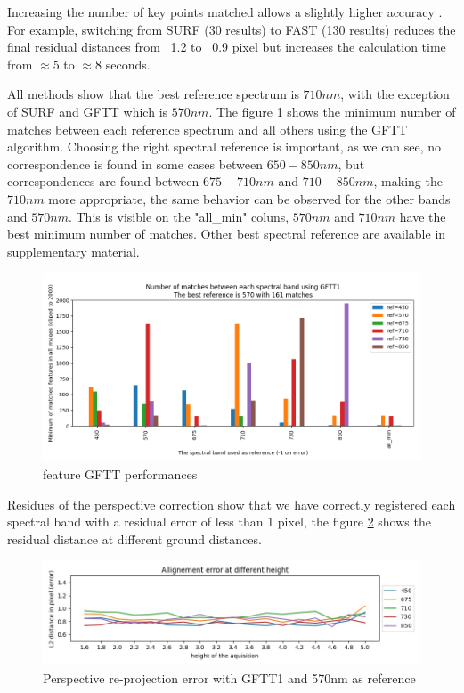 \documentclass[]{elsarticle}
\begin{document}
	\par Increasing the number of key points matched allows a slightly higher accuracy \cite{DantasDiasJunior, }.
	For example, switching from SURF (30 results) to FAST (130 results) reduces the final residual distances from ~1.2 to ~0.9 pixel but increases the calculation time from $\approx 5$ to $\approx 8$ seconds.
	\\
	\par All methods show that the best reference spectrum is $710nm$, with the exception of SURF and GFTT which is $570nm$.
	The figure \ref{fig:features-GFTT-performances} shows the minimum number of matches between each reference spectrum and all others using the GFTT algorithm.
	Choosing the right spectral reference is important, as we can see, no correspondence is found in some cases between $650-850nm$,
	but correspondences are found between $675-710nm$ and $710-850nm$, making the $710nm$ more appropriate,
	the same behavior can be observed for the other bands and $570nm$.
	This is visible on the "all\_min" coluns, $570nm$ and $710nm$ have the best minimum number of matches.
	Other best spectral reference are available in supplementary material.
	
	\begin{figure}[H]
		\centering
		\includegraphics[width=0.9\linewidth]{../figures/comparaison-keypoint-matching-reference-GFTT1.png}
		\caption{feature GFTT performances}
		\label{fig:features-GFTT-performances}
	\end{figure}
	
	\par Residues of the perspective correction show that we have correctly registered each spectral band with a residual error of less than 1 pixel,
	the figure \ref{fig:perspective-error} shows the residual distance at different ground distances.
	
	\begin{figure}[H]
		\centering
		\includegraphics[width=0.8\linewidth]{../figures/prespective-allignement-rmse.jpg}
		\caption{Perspective re-projection error with GFTT1 and 570nm as reference}
		\label{fig:perspective-error}
	\end{figure}
	
\end{document}
